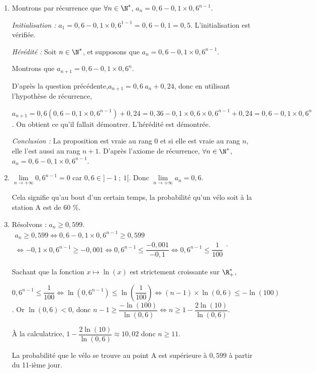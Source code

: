 \begin{enumerate}
\begin{enumerate}
		Donc $\forall n\in \N^*$, $a_{n+1}=0,84~a_n+0,24(1-a_n)=0,6~a_n+0,24$
		\item Montrons par récurrence que $\forall n \in \N^*$, $a_n = 0,6 - 0,1 \times 0,6^{n - 1}$.
						
		\textit{Initialisation :} $a_1=0,6 - 0,1 \times 0,6^{1 - 1}=0,6-0,1=0,5$. L'initialisation est vérifiée.
				
		\textit{Hérédité :} Soit  $n \in \N^*$, et supposons que $a_n = 0,6 - 0,1 \times 0,6^{n - 1}$.
		
		Montrons que $a_{n+1} = 0,6 - 0,1 \times 0,6^{n}$.
				
		D'après la question précédente,$a_{n+1}=0,6~a_n+0,24$, donc en utilisant l'hypothèse de récurrence,
		
		$a_{n+1}=0,6\left(0,6 - 0,1 \times 0,6^{n - 1}\right)+0,24=0,36-0,1\times0,6 \times0,6^{n - 1}+0,24=0,6-0,1\times 0,6^n $. On obtient ce qu'il fallait démontrer. L'hérédité est démontrée.
				
		\textit{Conclusion : }  La proposition est vraie au rang $0$ et si elle est vraie au rang $n$, elle l'est aussi au rang $n + 1$.	D'après l'axiome de récurrence, $\forall n \in \N^*$, $a_n = 0,6 - 0,1 \times 0,6^{n - 1}$.
		\item $\displaystyle\lim\limits_{n \rightarrow +\infty} 0,6^{n-1}=0$ car $0,6\in ]-1~;~1[$. Donc $\displaystyle\lim\limits_{n \rightarrow +\infty} a_n=0,6$.
		
		Cela signifie qu'au bout d'un certain temps, la probabilité qu'un vélo soit à la station A est de 60 \%.
		\item Résolvons : $a_n\geqslant 0,599$.
		$\begin{gathered}a_n\geqslant 0,599\iff  0,6 - 0,1 \times 0,6^{n - 1} \geqslant 0,599 \\
		\iff - 0,1 \times 0,6^{n - 1} \geqslant -0,001 \iff 0,6^{n - 1} \leqslant \dfrac{-0,001}{-0,1} \iff 0,6^{n - 1} \leqslant \dfrac{1}{100} \end{gathered}$.
		
		Sachant que la fonction $x\mapsto\ln(x)$ est strictement croissante sur $\R_+^*$, 
		
		$0,6^{n - 1} \leqslant \dfrac{1}{100} \iff \ln\left(0,6^{n - 1} \right) \leqslant \ln\left(\dfrac{1}{100}\right) \iff (n-1)\times \ln(0,6) \leqslant -\ln(100)$. Or $\ln(0,6)<0$, donc
		$n-1 \geqslant \dfrac{-\ln(100)}{\ln(0,6)} \iff n \geqslant 1-\dfrac{2\ln(10)}{\ln(0,6)}$.
		
		À la calculatrice, $1-\dfrac{2\ln(10)}{\ln(0,6)}\approx 10,02$ donc $n\geqslant 11$.
		
		La probabilité que le vélo se trouve au point A est supérieure à $0,599$ à partir du 11-ième jour.
		\end{enumerate}
\end{enumerate}

\bigskip
